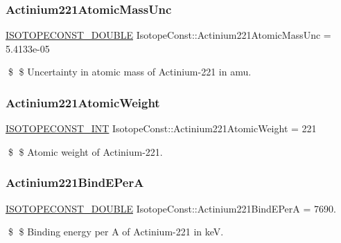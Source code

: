 \subsubsection{\texorpdfstring{Actinium221\+Atomic\+Mass\+Unc}{Actinium221AtomicMassUnc}}
{\footnotesize\ttfamily \mbox{\hyperlink{group___isotope_const-_macros_ga8f45a7272ce02c0b4c65c44636ed719a}{I\+S\+O\+T\+O\+P\+E\+C\+O\+N\+S\+T\+\_\+\+D\+O\+U\+B\+LE}} Isotope\+Const\+::\+Actinium221\+Atomic\+Mass\+Unc = 5.\+4133e-\/05}

\$ \$ Uncertainty in atomic mass of Actinium-\/221 in amu. \mbox{\label{group___isotope_const-_actinium-_ac221_ga0a2c9336430921bf5c47d4fa428960ae}} 
\subsubsection{\texorpdfstring{Actinium221\+Atomic\+Weight}{Actinium221AtomicWeight}}
{\footnotesize\ttfamily \mbox{\hyperlink{group___isotope_const-_macros_ga5f18360b3e99483a35c32d789e62621c}{I\+S\+O\+T\+O\+P\+E\+C\+O\+N\+S\+T\+\_\+\+I\+NT}} Isotope\+Const\+::\+Actinium221\+Atomic\+Weight = 221}

\$ \$ Atomic weight of Actinium-\/221. \mbox{\label{group___isotope_const-_actinium-_ac221_ga6b2bc40ffb1d0aa4c3a5b00796c7c869}} 
\subsubsection{\texorpdfstring{Actinium221\+Bind\+E\+PerA}{Actinium221BindEPerA}}
{\footnotesize\ttfamily \mbox{\hyperlink{group___isotope_const-_macros_ga8f45a7272ce02c0b4c65c44636ed719a}{I\+S\+O\+T\+O\+P\+E\+C\+O\+N\+S\+T\+\_\+\+D\+O\+U\+B\+LE}} Isotope\+Const\+::\+Actinium221\+Bind\+E\+PerA = 7690.}

\$ \$ Binding energy per A of Actinium-\/221 in keV. \mbox{\label{group___isotope_const-_actinium-_ac221_ga4a2d3a1e79e7fda7eb9cce2489ec467a}} 

